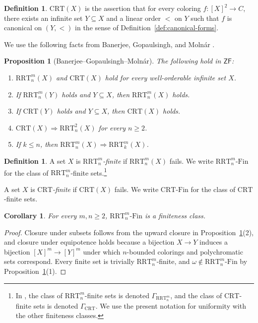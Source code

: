\documentclass[10pt,a4paper]{amsart}
\newtheorem{proposition}[theorem]{Proposition}
\newtheorem{corollary}[theorem]{Corollary}
\theoremstyle{definition}
\newtheorem{definition}[theorem]{Definition}
\newcommand{\ZF}{\mathsf{ZF}}
\newcommand{\RRT}{\mathrm{RRT}}
\newcommand{\CRT}{\mathrm{CRT}}
\newcommand{\RRTFin}[2]{\RRT^{#1}_{#2}\text{-}\mathrm{Fin}}
\newcommand{\CRTFin}{\CRT\text{-}\mathrm{Fin}}
\begin{document}
\begin{definition}\label{def:crt}
\(\CRT(X)\) is the assertion that for every coloring \(f:[X]^2\to C\), there exists an infinite set \(Y\subseteq X\) and a linear order \(<\) on \(Y\) such that \(f\) is canonical on \((Y,<)\) in the sense of Definition~\ref{def:canonical-forms}.
\end{definition}

We use the following facts from Banerjee, Gopaulsingh, and Moln\'ar \cite{BGM}.

\begin{proposition}[Banerjee--Gopaulsingh--Moln\'ar]\label{prop:bgm}
The following hold in \(\ZF\):
\begin{enumerate}[label=(\arabic*)]
    \item \(\RRT^m_n(X)\) and \(\CRT(X)\) hold for every well-orderable infinite set \(X\).
    \item If \(\RRT^m_n(Y)\) holds and \(Y\subseteq X\), then \(\RRT^m_n(X)\) holds.
    \item If \(\CRT(Y)\) holds and \(Y\subseteq X\), then \(\CRT(X)\) holds.
    \item \(\CRT(X)\Rightarrow \RRT^2_n(X)\) for every \(n\geq 2\).
    \item If \(k\leq n\), then \(\RRT^m_n(X)\Rightarrow \RRT^m_k(X)\).
\end{enumerate}
\end{proposition}

\begin{definition}
A set \(X\) is \emph{\(\RRT^m_n\)-finite} if \(\RRT^m_n(X)\) fails.  We write \(\RRTFin{m}{n}\) for the class of \(\RRT^m_n\)-finite sets.\footnote{In \cite{BGM}, the class of \(\RRT^m_n\)-finite sets is denoted \(\Gamma_{\RRT^m_n}\), and the class of \(\CRT\)-finite sets is denoted \(\Gamma_{\CRT}\).  We use the present notation for uniformity with the other finiteness classes.}

A set \(X\) is \emph{\(\CRT\)-finite} if \(\CRT(X)\) fails.  We write \(\CRTFin\) for the class of \(\CRT\)-finite sets.
\end{definition}

\begin{corollary}\label{cor:rrt-fin-class}
For every \(m,n\geq 2\), \(\RRTFin{m}{n}\) is a finiteness class.
\end{corollary}

\begin{proof}
Closure under subsets follows from the upward closure in Proposition~\ref{prop:bgm}(2), and closure under equipotence holds because a bijection \(X\to Y\) induces a bijection \([X]^m\to[Y]^m\) under which \(n\)-bounded colorings and polychromatic sets correspond.  Every finite set is trivially \(\RRT^m_n\)-finite, and \(\omega\notin\RRTFin{m}{n}\) by Proposition~\ref{prop:bgm}(1).
\end{proof}
\end{document}

